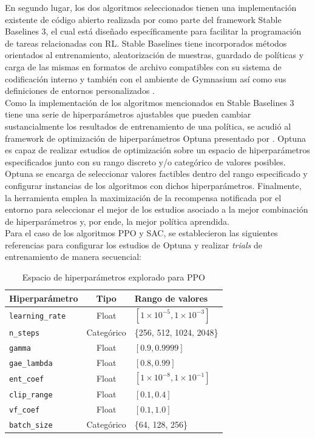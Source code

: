 En segundo lugar, los dos algoritmos seleccionados tienen una implementación existente de código abierto realizada por \textcite{raffin2021stable} como parte del framework Stable Baselines 3, el cual está diseñado específicamente para facilitar la programación de tareas relacionadas con RL. Stable Baselines tiene incorporados métodos orientados al entrenamiento, aleatorización de muestras, guardado de políticas y carga de las mismas en formatos de archivo compatibles con su sistema de codificación interno y también con el ambiente de Gymnasium así como sus definiciones de entornos personalizados \parencite{raffin2021stable}.\\

Como la implementación de los algoritmos mencionados en Stable Baselines 3 tiene una serie de hiperparámetros ajustables que pueden cambiar sustancialmente los resultados de entrenamiento de una política, se acudió al framework de optimización de hiperparámetros Optuna presentado por \textcite{optuna_2019}. Optuna es capaz de realizar estudios de optimización sobre un espacio de hiperparámetros especificados junto con su rango discreto y/o categórico de valores posibles. Optuna se encarga de seleccionar valores factibles dentro del rango especificado y configurar instancias de los algoritmos con dichos hiperparámetros. Finalmente, la herramienta emplea la maximización de la recompensa notificada por el entorno para seleccionar el mejor de los estudios asociado a la mejor combinación de hiperparámetros y, por ende, la mejor política aprendida.\\

Para el caso de los algoritmos PPO y SAC, se establecieron las siguientes referencias para configurar los estudios de Optuna y realizar \textit{trials} de entrenamiento de manera secuencial:

\begin{table}[h!]
	\centering
	\caption{Espacio de hiperparámetros explorado para PPO}
	\begin{tabular}{|l|c|l|}
		\hline
		\textbf{Hiperparámetro} & \textbf{Tipo} & \textbf{Rango de valores} \\
		\hline
		\texttt{learning\_rate} & Float & $[1\times10^{-5}, 1\times10^{-3}]$ \\
		\texttt{n\_steps} & Categórico & \{256, 512, 1024, 2048\} \\
		\texttt{gamma} & Float & $[0.9, 0.9999]$ \\
		\texttt{gae\_lambda} & Float & $[0.8, 0.99]$ \\
		\texttt{ent\_coef} & Float & $[1\times10^{-8}, 1\times10^{-1}]$ \\
		\texttt{clip\_range} & Float & $[0.1, 0.4]$ \\
		\texttt{vf\_coef} & Float & $[0.1, 1.0]$ \\
		\texttt{batch\_size} & Categórico & \{64, 128, 256\} \\
		\hline
	\end{tabular}
	\label{tab:optuna-ppo}
\end{table}

